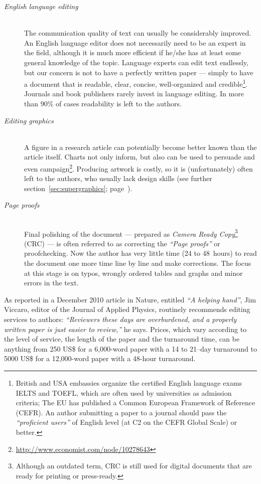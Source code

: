 \documentclass[graybox,envcountchap,sectrefs,UStrade]{svmono}
\begin{document}
\begin{description}
  \item[\emph{English language editing}] \hfill \\
   The communication quality of text can usually be considerably improved. An English language editor does not necessarily need to be an expert in the field, although it is much more efficient if he/she has at least some general knowledge of the topic. Language experts can edit text endlessly, but our concern is not to have a perfectly written paper --- simply to have a document that is readable, clear, concise, well-organized and credible\footnote{British and USA embassies organize the certified English language exams IELTS and TOEFL, which are often used by universities as admission criteria; The EU has published a Common European Framework of Reference (CEFR). An author submitting a paper to a journal should pass the \emph{``proficient users''} of English level (at C2 on the CEFR Global Scale) or better.}. Journals and book publishers rarely invest in language editing. In more than 90\% of cases readability is left to the authors. \medskip
  \item[\emph{Editing graphics}] \hfill \\
   A figure in a research article can potentially become better known than the article itself. Charts not only inform, but also can be used to persuade and even campaign\footnote{\url{http://www.economist.com/node/10278643}}. Producing artwork is costly, so it is (unfortunately) often left to the authors, who usually lack design skills (see further section~\ref{sec:supergraphics}; page~\pageref{sec:supergraphics}). \medskip
  \item[\emph{Page proofs}] \hfill \\
   Final polishing of the document --- prepared as \emph{Camera Ready Copy}\footnote{Although an outdated term, CRC is still used for digital documents that are ready for printing or press-ready.} (CRC) --- is often referred to as correcting the \emph{``Page proofs''} or proofchecking. Now the author has very little time (24 to 48~hours) to read the document one more time line by line and make corrections. The focus at this stage is on typos, wrongly ordered tables and graphs and minor errors in the text.
\end{description}

As reported in a December 2010 article in Nature, entitled \emph{``A helping hand''}, Jim Viccaro, editor of the Journal of Applied Physics, routinely recommends editing services to authors: \emph{``Reviewers these days are overburdened, and a properly written paper is just easier to review,''} he says. Prices, which vary according to the level of service, the length of the paper and the turnaround time, can be anything from 250 US\$ for a 6,000-word paper with a 14 to 21--day turnaround to 5000 US\$ for a 12,000-word paper with a 48-hour turnaround.\par
\end{document}

